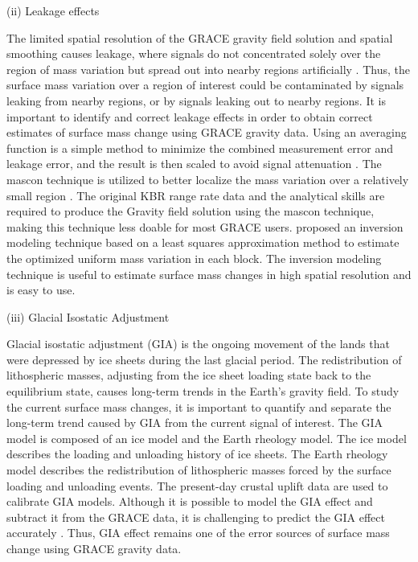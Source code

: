 (ii) Leakage effects

The limited spatial resolution of the GRACE gravity field solution and spatial smoothing causes leakage, where signals do not concentrated solely over the region of mass variation but spread out into nearby regions artificially \cite[e.g.,][]{chen2006antarctic}.  Thus, the surface mass variation over a region of interest could be contaminated by signals leaking from nearby regions, or by signals leaking out to nearby regions. It is important to identify and correct leakage effects in order to obtain correct estimates of surface mass change using GRACE gravity data.  Using an averaging function is a simple method to minimize the combined measurement error and leakage error, and the result is then scaled to avoid signal attenuation \cite[]{velicogna2006chpt2}.  The mascon technique is utilized to better localize the mass variation over a relatively small region \cite[]{rowlands2005chpt2}.  The original KBR range rate data and the analytical skills are required to produce the Gravity field solution using the mascon technique, making this technique less doable for most GRACE users.  \citet{schrama2011chpt2} proposed an inversion modeling technique based on a least squares approximation method to estimate the optimized uniform mass variation in each block.  The inversion modeling technique is useful to estimate surface mass changes in high spatial resolution and is easy to use.  

(iii) Glacial Isostatic Adjustment

Glacial isostatic adjustment (GIA) is the ongoing movement of the lands that were depressed by ice sheets during the last glacial period.  The redistribution of lithospheric masses, adjusting from the ice sheet loading state back to the equilibrium state, causes long-term trends in the Earth’s gravity field.  To study the current surface mass changes, it is important to quantify and separate the long-term trend caused by GIA from the current signal of interest.  The GIA model is composed of an ice model and the Earth rheology model.  The ice model describes the loading and unloading history of ice sheets.  The Earth rheology model describes the redistribution of lithospheric masses forced by the surface loading and unloading events.  The present-day crustal uplift data are used to calibrate GIA models.  Although it is possible to model the GIA effect and subtract it from the GRACE data, it is challenging to predict the GIA effect accurately \cite[]{thomas2011chpt2}.  Thus, GIA effect remains one of the error sources of surface mass change using GRACE gravity data.  


